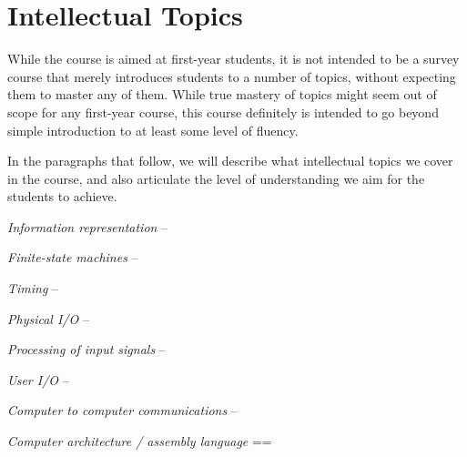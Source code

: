 \section{Intellectual Topics}
\label{sec:topics}

While the course is aimed at first-year students, it is not intended
to be a survey course that merely introduces students to a number of
topics, without expecting them to master any of them.
While true mastery of topics might seem out of scope for
any first-year course, this course definitely is intended to go
beyond simple introduction to at least some level of fluency.

In the paragraphs that follow, we will describe what intellectual
topics we cover in the course, and also articulate the level
of understanding we aim for the students to achieve.

\emph{Information representation} --

\emph{Finite-state machines} --

\emph{Timing} --

\emph{Physical I/O} --

\emph{Processing of input signals} --

\emph{User I/O} --

\emph{Computer to computer communications} --

\emph{Computer architecture / assembly language} ==


